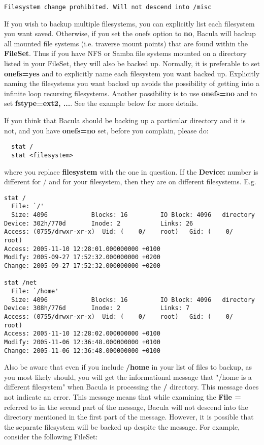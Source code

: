\begin{description}
\footnotesize
\begin{verbatim}
Filesystem change prohibited. Will not descend into /misc
\end{verbatim}
\normalsize

   If you wish to backup multiple filesystems, you can  explicitly
   list each filesystem you want saved.  Otherwise, if you set the onefs option
   to {\bf no}, Bacula will backup  all mounted file systems (i.e. traverse mount
   points) that  are found within the {\bf FileSet}. Thus if  you have NFS or
   Samba file systems mounted on a directory listed  in your FileSet, they will
   also be backed up. Normally, it is  preferable to set {\bf onefs=yes} and to
   explicitly name  each filesystem you want backed up. Explicitly naming  the
   filesystems you want backed up avoids the possibility  of getting into a
   infinite loop recursing filesystems.  Another possibility is to 
   use {\bf onefs=no} and to set {\bf fstype=ext2, ...}.             
   See the example below for more details. 

   If you think that Bacula should be backing up a particular directory
   and it is not, and you have {\bf onefs=no} set, before you complain,
   please do:

\footnotesize
\begin{verbatim}
  stat /
  stat <filesystem>
\end{verbatim}
\normalsize

where you replace {\bf filesystem} with the one in question.  If the 
{\bf Device:} number is different for / and for your filesystem, then they
are on different filesystems.  E.g.
\footnotesize
\begin{verbatim}
stat /
  File: `/'
  Size: 4096            Blocks: 16         IO Block: 4096   directory
Device: 302h/770d       Inode: 2           Links: 26
Access: (0755/drwxr-xr-x)  Uid: (    0/    root)   Gid: (    0/    root)
Access: 2005-11-10 12:28:01.000000000 +0100
Modify: 2005-09-27 17:52:32.000000000 +0200
Change: 2005-09-27 17:52:32.000000000 +0200

stat /net
  File: `/home'
  Size: 4096            Blocks: 16         IO Block: 4096   directory
Device: 308h/776d       Inode: 2           Links: 7
Access: (0755/drwxr-xr-x)  Uid: (    0/    root)   Gid: (    0/    root)
Access: 2005-11-10 12:28:02.000000000 +0100
Modify: 2005-11-06 12:36:48.000000000 +0100
Change: 2005-11-06 12:36:48.000000000 +0100
\end{verbatim}
\normalsize

   Also be aware that even if you include {\bf /home} in your list
   of files to backup, as you most likely should, you will get the
   informational message that  "/home is a different filesystem" when 
   Bacula is processing the {\bf /} directory.  This message does not
   indicate an error. This message means that while examining the 
   {\bf File =} referred to in the second part of the message, Bacula will 
   not descend into the directory mentioned in the first part of the message.
   However, it is possible that the separate filesystem will be backed up 
   despite the message. For example, consider the following FileSet:


\end{description}
